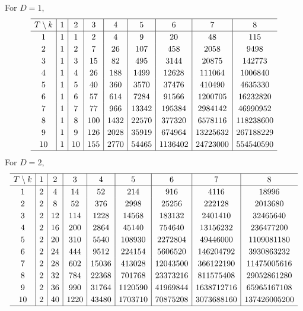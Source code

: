 \documentclass[10pt,a4paper]{amsart}
\numberwithin{equation}{section}
\begin{document}
For $D=1$,
\begin{gather*}
\setlength{\tabcolsep}{4.5pt}
\renewcommand{\arraystretch}{1.2}
\begin{tabular}{c|c|c|c|c|c|c|c|c}
\hline $T\setminus k$&1&2&3&4&5&6&7&8\\ \hline
1& 1& 1& 2& 4& 9& 20& 48& 115\\
2&1& 2& 7& 26& 107& 458& 2058& 9498\\
3&1& 3& 15& 82& 495& 3144& 20875& 142773\\
4&1& 4& 26& 188& 1499& 12628& 111064& 1006840\\
5&1& 5& 40& 360& 3570& 37476& 410490& 4635330\\
6&1& 6& 57& 614& 7284& 91566& 1200705& 16232820\\
7&1& 7& 77& 966& 13342& 195384& 2984142& 46990952\\
8&1& 8& 100& 1432& 22570& 377320& 6578116& 118238600\\
9&1& 9& 126& 2028& 35919& 674964& 13225632& 267188229\\
10&1& 10& 155& 2770& 54465& 1136402& 24723000& 554540590\\
\hline
\end{tabular}
\end{gather*}
For $D=2$,
\begin{gather*}
\setlength{\tabcolsep}{4.5pt}
\renewcommand{\arraystretch}{1.2}
\begin{tabular}{c|c|c|c|c|c|c|c|c}
\hline $T\setminus k$&1&2&3&4&5&6&7&8\\ \hline
1&2& 4& 14& 52& 214& 916& 4116& 18996\\
2&2& 8& 52& 376& 2998& 25256& 222128& 2013680\\
3&2& 12& 114& 1228& 14568& 183132& 2401410& 32465640\\
4&2& 16& 200& 2864& 45140& 754640& 13156232& 236477200\\
5&2& 20& 310& 5540& 108930& 2272804& 49446000& 1109081180\\
6&2& 24& 444& 9512& 224154& 5606520& 146204792& 3930863232\\
7&2& 28& 602& 15036& 413028& 12043500& 366122190& 11475005616\\
8&2& 32& 784& 22368& 701768& 23373216& 811575408& 29052861280\\
9&2& 36& 990& 31764& 1120590& 41969844& 1638712716& 65965167108\\
10&2& 40& 1220& 43480& 1703710& 70875208& 3073688160& 137426005200\\
\hline
\end{tabular}
\end{gather*}
\end{document}
